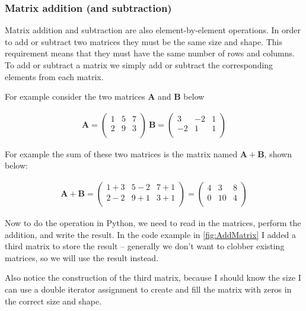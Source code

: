 \clearpage
 \subsubsection{Matrix addition (and subtraction)}
Matrix addition and subtraction are also element-by-element operations.
In order to add or subtract two matrices they must be the same size and shape.  
This requirement means that they must have the same number of rows and columns.  
To add or subtract a matrix we simply add or subtract the corresponding elements from each matrix.

For example consider the two matrices $\mathbf{A}$ and $\mathbf{B}$ below

\begin{gather}
\mathbf{A}=
\begin{pmatrix}
1 & 5 & 7 \\
2 & 9 & 3 \\
\end{pmatrix}
~ 
\mathbf{B}=
\begin{pmatrix}
3 & -2 & 1 \\
-2 & 1 & 1 \\
\end{pmatrix}
\end{gather}

For example the sum of these two matrices is the matrix named $\mathbf{A+B}$,  shown below:

\begin{gather}
\mathbf{A+B}=
\begin{pmatrix}
1+3 & 5-2 & 7+1 \\
2-2 & 9+1 & 3+1 \\
\end{pmatrix}
=
\begin{pmatrix}
4 & 3 & 8 \\
0 & 10 & 4 \\
\end{pmatrix}
\end{gather}

Now to do the operation in Python, we need to read in the matrices, perform the addition, and write the result.  
In the code example in \ref{fig:AddMatrix} I added a third matrix to store the result -- generally we don't want to clobber existing matrices, so we will use the result instead.   

Also notice the construction of the third matrix, because I should know the size I can use a double iterator assignment to create and fill the matrix with zeros in the correct size and shape.  

